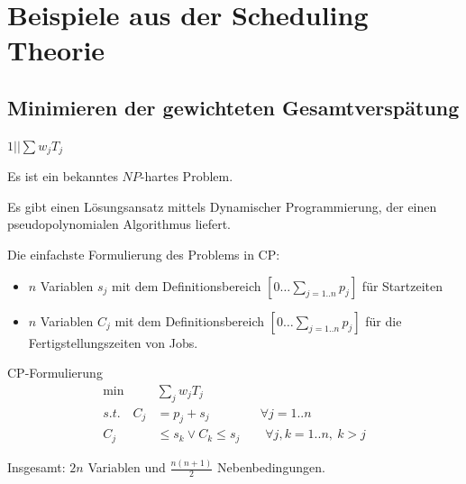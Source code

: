 \documentclass[hyperref={pdfpagelabels=false}]{beamer}
\newcommand{\inhalt}{\frame{   \frametitle{Überblick}   \tableofcontents[currentsection]}}
\begin{document}
\section{Beispiele aus der Scheduling Theorie}
\inhalt
\subsection{Minimieren der gewichteten Gesamtverspätung}
\begin{frame}[allowframebreaks]{$1||\sum{w_jT_j}$}

Es ist ein bekanntes {\color{darkred}$NP$-hartes Problem}. 

\begin{block}{}
Es gibt einen Lösungsansatz mittels {\color{darkred}Dynamischer Programmierung}, der einen pseudopolynomialen Algorithmus liefert.
\end{block}
\vspace{10pt}
Die einfachste Formulierung des Problems in CP:
\begin{itemize}
\item $n$ Variablen $s_j$ mit dem Definitionsbereich $[0\dots \sum_{j=1..n}p_j]$ für Startzeiten
\item $n$ Variablen $C_j$ mit dem Definitionsbereich $[0\dots \sum_{j=1..n}p_j]$ für die Fertigstellungszeiten von Jobs.
\end{itemize}

\vspace{20pt}

\begin{block}{CP-Formulierung}
\begin{align}
 \min & \sum_{j}{w_jT_j} \nonumber \\
 s.t.\quad C_j & = p_j + s_j\qquad\qquad \forall j=1..n \nonumber \\
 C_j  & \le s_k \vee  C_k \le s_j \qquad \forall j,k=1..n,\ k>j \nonumber
\end{align}
\end{block}

Insgesamt: $2n$ Variablen und $\frac{n(n+1)}{2}$ Nebenbedingungen.

\newpage


\end{frame}
\end{document}

